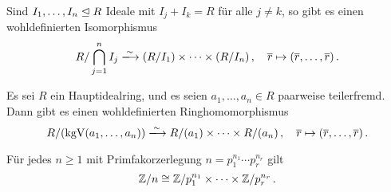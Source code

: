 \begin{theorem}
  Sind $I_1, \dotsc, I_n \mathrel{\trianglelefteq} R$ Ideale mit $I_j + I_k = R$ für alle $j \neq k$, so gibt es einen wohldefinierten Isomorphismus
  \[
                            R / \bigcap_{j=1}^n I_j
    \xlongrightarrow{\sim}  (R/I_1) \times \dotsb \times (R/I_n) \,,
    \quad                   \class{r}
    \mapsto                 (\class{r}, \dotsc, \class{r}) \,.
  \]
\end{theorem}

\begin{corollary}
  Es sei $R$ ein Hauptidealring, und es seien $a_1, \dotsc, a_n \in R$ paarweise teilerfremd.
  Dann gibt es einen wohldefinierten Ringhomomorphismus
  \[
                            R/\genideal{\kgV(a_1, \dotsc, a_n)}
    \xlongrightarrow{\sim}  R/\genideal{a_1} \times \dotsb \times R/\genideal{a_n} \,,
    \quad                   \class{r}
    \mapsto                 ( \class{r}, \dotsc, \class{r} ) \,.
  \]
\end{corollary}

\begin{corollary}
  Für jedes $n \geq 1$ mit Primfakorzerlegung $n = p_1^{n_1} \dotsm p_r^{n_r}$ gilt
  \[
          \mathbb{Z}/n
    \cong \mathbb{Z}/p_1^{n_1} \times \dotsb \times \mathbb{Z}/p_r^{n_r} \,.
  \]
\end{corollary}















